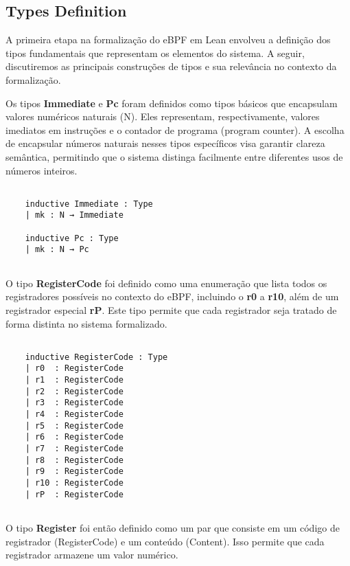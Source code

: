 \documentclass[sigconf]{acmart}
\begin{document}
\subsection{Types Definition}

A primeira etapa na formalização do eBPF em Lean envolveu a definição dos tipos fundamentais que representam os elementos do sistema. A seguir, discutiremos as principais construções de tipos e sua relevância no contexto da formalização.

Os tipos \textbf{Immediate} e \textbf{Pc} foram definidos como tipos básicos que encapsulam valores numéricos naturais (N). Eles representam, respectivamente, valores imediatos em instruções e o contador de programa (program counter). A escolha de encapsular números naturais nesses tipos específicos visa garantir clareza semântica, permitindo que o sistema distinga facilmente entre diferentes usos de números inteiros.

\begin{center}
\begin{verbatim}

    inductive Immediate : Type 
    | mk : N → Immediate
    
    inductive Pc : Type 
    | mk : N → Pc
    
\end{verbatim}
\end{center}

O tipo \textbf{RegisterCode} foi definido como uma enumeração que lista todos os registradores possíveis no contexto do eBPF, incluindo o \textbf{r0} a \textbf{r10}, além de um registrador especial \textbf{rP}. Este tipo permite que cada registrador seja tratado de forma distinta no sistema formalizado.

\begin{center}
\begin{verbatim}
    
    inductive RegisterCode : Type
    | r0  : RegisterCode
    | r1  : RegisterCode
    | r2  : RegisterCode
    | r3  : RegisterCode
    | r4  : RegisterCode
    | r5  : RegisterCode
    | r6  : RegisterCode
    | r7  : RegisterCode
    | r8  : RegisterCode
    | r9  : RegisterCode
    | r10 : RegisterCode
    | rP  : RegisterCode
    
\end{verbatim}
\end{center}

O tipo \textbf{Register} foi então definido como um par que consiste em um código de registrador (RegisterCode) e um conteúdo (Content). Isso permite que cada registrador armazene um valor numérico.
\end{document}

